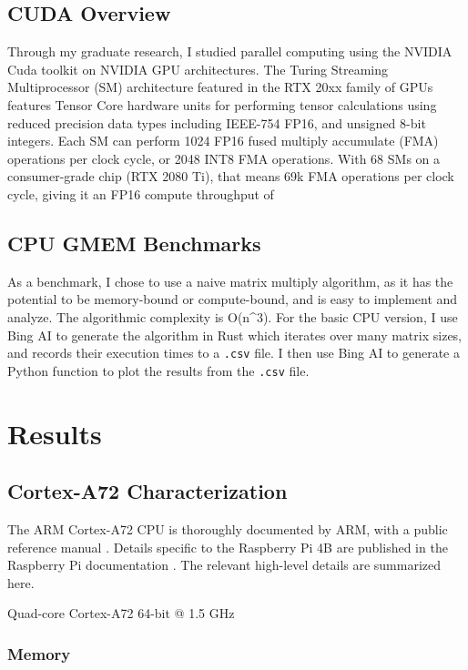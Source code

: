 \documentclass[12pt]{article}
\begin{document}
\subsection{CUDA Overview}
Through my graduate research, I studied parallel computing using the NVIDIA Cuda toolkit on NVIDIA GPU architectures. The Turing Streaming Multiprocessor (SM) architecture featured in the RTX 20xx family of GPUs features Tensor Core hardware units for performing tensor calculations using reduced precision data types including IEEE-754 FP16, and unsigned 8-bit integers. Each SM can perform 1024 FP16 fused multiply accumulate (FMA) operations per clock cycle, or 2048 INT8 FMA operations. With 68 SMs on a consumer-grade chip (RTX 2080 Ti), that means 69k FMA operations per clock cycle, giving it an FP16 compute throughput of 

\subsection{CPU GMEM Benchmarks}

As a benchmark, I chose to use a naive matrix multiply algorithm, as it has the potential to be memory-bound or compute-bound, and is easy to implement and analyze. The algorithmic complexity is O(n\textasciicircum3). For the basic CPU version, I use Bing AI to generate the algorithm in Rust which iterates over many matrix sizes, and records their execution times to a \verb|.csv| file. I then use Bing AI to generate a Python function to plot the results from the \verb|.csv| file.

\section{Results}\label{sec:results}

\subsection{Cortex-A72 Characterization}

The ARM Cortex-A72 CPU is thoroughly documented by ARM, with a public reference manual \cite{ARM2021}. Details specific to the Raspberry Pi 4B are published in the Raspberry Pi documentation \cite{raspberrypi2024}. The relevant high-level details are summarized here.

Quad-core Cortex-A72 64-bit @ 1.5 GHz

\subsubsection{Memory}
\end{document}
